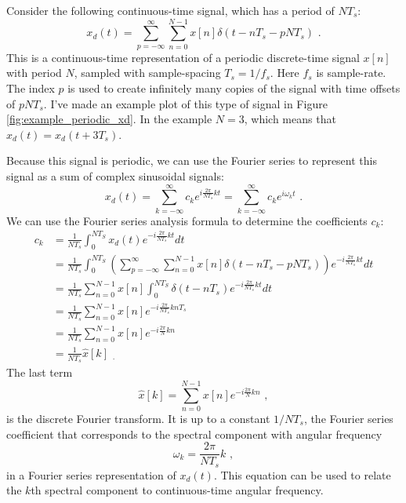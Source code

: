 Consider the following continuous-time signal, which has a
period of $N T_s$:
\begin{equation}
x_d(t) = \sum_{p=-\infty}^{\infty} \sum_{n=0}^{N-1} x[n] \delta(t - n T_s - p N T_s ) \,\,.
\label{eq:dtft_time_per0}
\end{equation}
This is a continuous-time representation of a periodic discrete-time
signal $x[n]$ with period $N$, sampled with sample-spacing $T_s =
1/f_s$. Here $f_s$ is sample-rate. The index $p$ is used to create
infinitely many copies of the signal with time offsets of
$pNT_s$. I've made an example plot of this type of signal in
Figure \ref{fig:example_periodic_xd}. In the example $N=3$, which
means that $x_d(t)=x_d(t+3T_s)$.

Because this signal is periodic, we can use the Fourier series to
represent this signal as a sum of complex sinusoidal signals:
\begin{equation}
x_d(t) = \sum_{k=-\infty}^{\infty} c_k e^{i\frac{2\pi}{NT_s}kt}  = \sum_{k=-\infty}^{\infty} c_k e^{i \omega_k t} \,\,.
\end{equation}
We can use the Fourier series analysis formula to determine the coefficients $c_k$:
\begin{align}
c_k &= \frac{1}{N T_s} \int_{0}^{N T_S} x_d(t) e^{-i\frac{2\pi}{N T_s}kt}dt \\
   &= \frac{1}{N T_s} \int_{0}^{N T_S} \left(\sum_{p=-\infty}^{\infty} \sum_{n=0}^{N-1} x[n] \delta(t - n T_s - p N T_s ) \right) e^{-i\frac{2\pi}{N T_s}kt}dt \\
   &= \frac{1}{N T_s} \sum_{n=0}^{N-1} x[n] \int_{0}^{N T_S} \delta(t - n T_s)  e^{-i\frac{2\pi}{N T_s}kt}dt \\
   &=  \frac{1}{N T_s} \sum_{n=0}^{N-1} x[n]  e^{-i\frac{2\pi}{N T_s}k n T_s} \\
   &=  \frac{1}{N T_s} \sum_{n=0}^{N-1} x[n] e^{-i\frac{2\pi}{N}kn  }\\
   &=  \frac{1}{N T_s} \hat{x}[k] \,\, _.
\end{align}
The last term
\begin{equation}
\hat{x}[k] = \sum_{n=0}^{N-1} x[n] e^{-i\frac{2\pi}{N}kn  } \,\,,
\label{eq:dtft_fs_0}
\end{equation}
is the discrete Fourier transform. It is up to a constant $1/NT_s$, the
Fourier series coefficient that corresponds to the spectral component
with angular frequency
\begin{equation}
\boxed{
\omega_k = \frac{2\pi}{N T_s}k
} \,\,,
\end{equation}
in a Fourier series representation of $x_d(t)$. This equation can
be used to relate the $k$th spectral component to continuous-time
angular frequency.

